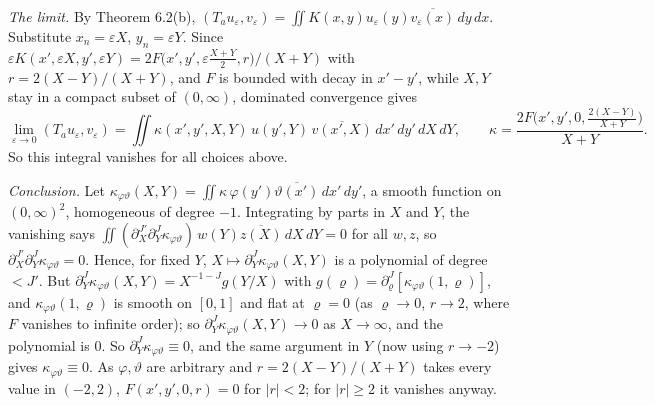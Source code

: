 \documentclass[
  11pt,
]{article}
\begin{document}
\emph{The limit.} By Theorem 6.2(b),
\((T_au_\varepsilon,v_\varepsilon)=\iint K(x,y)u_\varepsilon(y)\overline{v_\varepsilon(x)}\,dy\,dx\).
Substitute \(x_n=\varepsilon X\), \(y_n=\varepsilon Y\). Since
\(\varepsilon K(x',\varepsilon X,y',\varepsilon Y)=2F\big(x',y',\varepsilon\tfrac{X+Y}2,r\big)/(X+Y)\)
with \(r=2(X-Y)/(X+Y)\), and \(F\) is bounded with decay in \(x'-y'\),
while \(X,Y\) stay in a compact subset of \((0,\infty)\), dominated
convergence gives \[
\lim_{\varepsilon\to0}(T_au_\varepsilon,v_\varepsilon)=\iint\kappa(x',y',X,Y)\,u(y',Y)\,\overline{v(x',X)}\,dx'\,dy'\,dX\,dY,\qquad \kappa=\frac{2F\big(x',y',0,\frac{2(X-Y)}{X+Y}\big)}{X+Y}.
\] So this integral vanishes for all choices above.

\emph{Conclusion.} Let
\(\kappa_{\varphi\vartheta}(X,Y)=\iint\kappa\,\varphi(y')\overline{\vartheta(x')}\,dx'\,dy'\),
a smooth function on \((0,\infty)^2\), homogeneous of degree \(-1\).
Integrating by parts in \(X\) and \(Y\), the vanishing says
\(\iint(\partial_X^{J'}\partial_Y^J\kappa_{\varphi\vartheta})\,w(Y)\overline{z(X)}\,dX\,dY=0\)
for all \(w,z\), so
\(\partial_X^{J'}\partial_Y^J\kappa_{\varphi\vartheta}=0\). Hence, for
fixed \(Y\), \(X\mapsto\partial_Y^J\kappa_{\varphi\vartheta}(X,Y)\) is a
polynomial of degree \(<J'\). But
\(\partial_Y^J\kappa_{\varphi\vartheta}(X,Y)=X^{-1-J}g(Y/X)\) with
\(g(\varrho)=\partial_\varrho^J[\kappa_{\varphi\vartheta}(1,\varrho)]\),
and \(\kappa_{\varphi\vartheta}(1,\varrho)\) is smooth on \([0,1]\) and
flat at \(\varrho=0\) (as \(\varrho\to0\), \(r\to2\), where \(F\)
vanishes to infinite order); so
\(\partial_Y^J\kappa_{\varphi\vartheta}(X,Y)\to0\) as \(X\to\infty\),
and the polynomial is 0. So
\(\partial_Y^J\kappa_{\varphi\vartheta}\equiv0\), and the same argument
in \(Y\) (now using \(r\to-2\)) gives
\(\kappa_{\varphi\vartheta}\equiv0\). As \(\varphi,\vartheta\) are
arbitrary and \(r=2(X-Y)/(X+Y)\) takes every value in \((-2,2)\),
\(F(x',y',0,r)=0\) for \(|r|<2\); for \(|r|\geq2\) it vanishes anyway.
\end{document}
